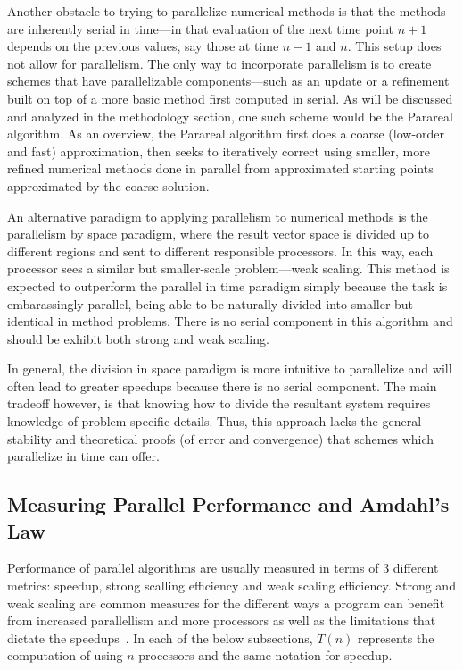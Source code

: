 \documentclass[letterpaper,12pt]{article}
\begin{document}
Another obstacle to trying to parallelize numerical methods is that the methods
are inherently serial in time---in that evaluation of the next time point $n+1$
depends on the previous values, say those at time $n-1$ and $n$. This setup
does not allow for parallelism. The only way to incorporate parallelism is to
create schemes that have parallelizable components---such as an update or a
refinement built on top of a more basic method first computed in serial. As will be discussed and analyzed in the
methodology section, one such scheme would be the Parareal algorithm. As an
overview, the Parareal algorithm first does a coarse (low-order and fast)
approximation, then seeks to iteratively correct using smaller, more refined
numerical methods done in parallel from approximated starting points
approximated by the coarse solution.

An alternative paradigm to applying parallelism to numerical methods is the
parallelism by space paradigm, where the result vector space is divided up to
different regions and sent to different responsible processors. In this way,
each processor sees a similar but smaller-scale problem---weak scaling. This
method is expected to outperform the parallel in time paradigm simply because
the task is embarassingly parallel, being able to be naturally divided
into smaller but identical in method problems. There is no serial component in
this algorithm and should be exhibit both strong and weak scaling.

In general, the division in space paradigm is more intuitive to parallelize and
will often lead to greater speedups because there is no serial component. The main tradeoff however, is that knowing how to divide the resultant system requires knowledge of problem-specific details. Thus, this approach lacks the
general stability and theoretical proofs (of error and convergence) that schemes which parallelize in
time can offer.

\subsection{Measuring Parallel Performance and Amdahl's Law}

Performance of parallel algorithms are usually measured in terms of 3 different
metrics: speedup, strong scalling efficiency and weak scaling efficiency.
Strong and weak scaling are common measures for the different ways a program can
benefit from increased parallellism and more processors as well as the
limitations that dictate the speedups~\cite{parallelscaling}. In each of the below subsections, $T(n)$ represents the computation of using $n$ processors and the same notation for speedup.
\end{document}
